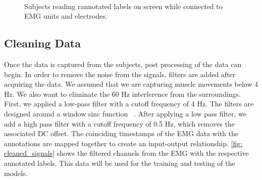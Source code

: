 \documentclass{article}
\begin{document}
\begin{figure}[!b] 
    \centering
    \\
  \caption{Subjects reading rannotated labels on screen while connected to EMG units and electrodes.}
  \label{fig: conn-ann} 
\end{figure}


\subsection{Cleaning Data}
\label{ssec:Cleaning Data}
Once the data is captured from the subjects, post processing of the data can begin. In order to remove the noise from the signals, filters are added after acquiring the data. We assumed that we are capturing muscle movements below 4 Hz. We also want to eliminate the 60 Hz interference from the surroundings. First, we applied a low-pass filter with a cutoff frequency of 4 Hz. The filters are designed around a window sinc function ~\cite{noauthor_how_nodate}. After applying a low pass filter, we add a high pass filter with a cutoff frequency of 0.5 Hz, which removes the associated DC offset. The coinciding timestamps of the EMG data with the annotations are mapped together to create an input-output relationship. \figurename \ref{fig: cleaned_signals} shows the filtered channels from the EMG with the respective annotated labels. This data will be used for the training and testing of the models. 
\end{document}
